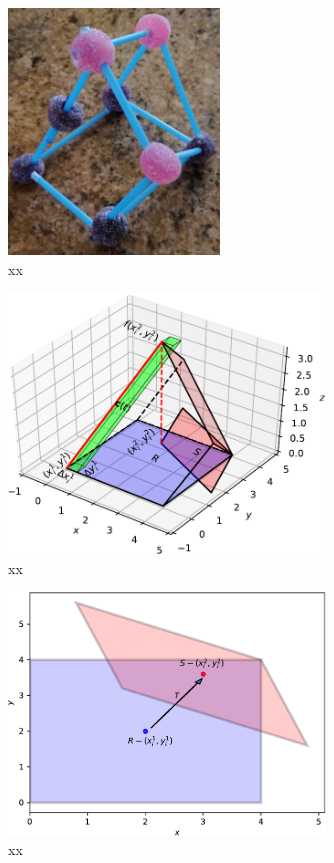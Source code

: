 \documentclass{article}
\theoremstyle{theorem}
\theoremstyle{definition}
\begin{document}
\begin{figure}[htb]
\centering
\includegraphics[width=0.5\textwidth]{prismatoid_real.jpg}
\caption{xx}
\label{fig:prismatoid_real}
\end{figure}

\begin{figure}[htb]
\centering
\includegraphics[width=0.75\textwidth]{prismatoid_solid.pdf}
\caption{xx}
\label{fig:prismatoid_solid}
\end{figure}

\begin{figure}[htb]
\centering
\includegraphics[width=0.75\textwidth]{prismatoid_regions.pdf}
\caption{xx}
\label{fig:prismatoid_regions}
\end{figure}
\end{document}
